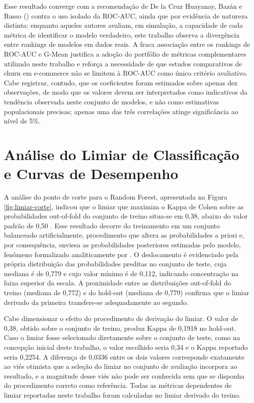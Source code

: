 Esse resultado converge com a recomendação de De la Cruz Huayanay, Bazán e Russo (\citeyear{delacruz2025}) contra o uso isolado da ROC-AUC, ainda que por evidência de natureza distinta: enquanto aqueles autores avaliam, em simulação, a capacidade de cada métrica de identificar o modelo verdadeiro, este trabalho observa a divergência entre rankings de modelos em dados reais. A fraca associação entre os rankings de ROC-AUC e G-Mean justifica a adoção do portfólio de métricas complementares utilizado neste trabalho e reforça a necessidade de que estudos comparativos de churn em e-commerce não se limitem à ROC-AUC como único critério avaliativo. Cabe registrar, contudo, que os coeficientes foram estimados sobre apenas dez observações, de modo que os valores devem ser interpretados como indicativos da tendência observada neste conjunto de modelos, e não como estimativas populacionais precisas; apenas uma das três correlações atinge significância ao nível de 5\%.

\FloatBarrier
\section{Análise do Limiar de Classificação e Curvas de Desempenho} \label{sec:limiar}

A análise do ponto de corte para o Random Forest, apresentada na Figura \ref{fig:limiar-corte}, indicou que o limiar que maximiza o Kappa de Cohen sobre as probabilidades out-of-fold do conjunto de treino situa-se em 0,38, abaixo do valor padrão de 0,50 \cite{fawcett2006}. Esse resultado decorre do treinamento em um conjunto balanceado artificialmente, procedimento que altera as probabilidades a priori e, por consequência, enviesa as probabilidades posteriores estimadas pelo modelo, fenômeno formalizado analiticamente por . O deslocamento é evidenciado pela própria distribuição das probabilidades preditas no conjunto de teste, cuja mediana é de 0,779 e cujo valor mínimo é de 0,112, indicando concentração na faixa superior da escala. A proximidade entre as distribuições out-of-fold do treino (mediana de 0,772) e do hold-out (mediana de 0,779) confirma que o limiar derivado da primeira transfere-se adequadamente ao segundo.

Cabe dimensionar o efeito do procedimento de derivação do limiar. O valor de 0,38, obtido sobre o conjunto de treino, produz Kappa de 0,1918 no hold-out. Caso o limiar fosse selecionado diretamente sobre o conjunto de teste, como na concepção inicial deste trabalho, o valor escolhido seria 0,34 e o Kappa reportado seria 0,2254. A diferença de 0,0336 entre os dois valores corresponde exatamente ao viés otimista que a seleção do limiar no conjunto de avaliação incorpora ao resultado, e a magnitude desse viés não pode ser conhecida sem que se disponha do procedimento correto como referência. Todas as métricas dependentes de limiar reportadas neste trabalho foram calculadas no limiar derivado do treino.

